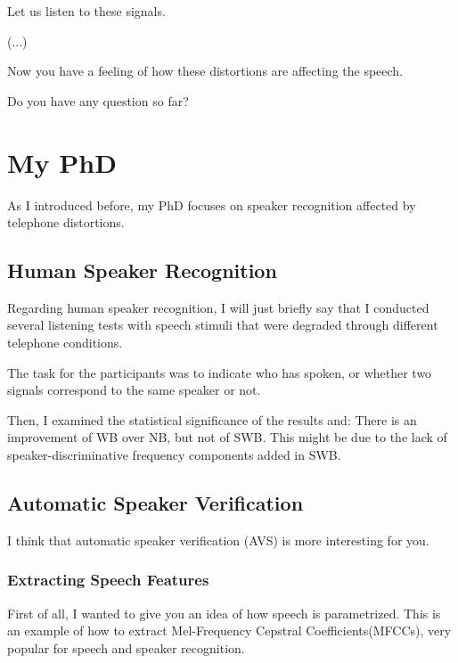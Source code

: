 \documentclass[a4paper]{article}
\begin{document}
Let us listen to these signals.

(...)

Now you have a feeling of how these distortions are affecting the speech.

Do you have any question so far?



\section{My PhD}

As I introduced before, my PhD focuses on speaker recognition affected by telephone distortions.

\subsection{Human Speaker Recognition}

Regarding human speaker recognition, I will just briefly say that I conducted several listening tests with speech stimuli that were degraded through different telephone conditions. 

The task for the participants was to indicate who has spoken, or whether two signals correspond to the same speaker or not.

Then, I examined the statistical significance of the results and: There is an improvement of WB over NB, but not of SWB. This might be due to the lack of speaker-discriminative frequency components added in SWB.


\subsection{Automatic Speaker Verification}

I think that automatic speaker verification (AVS) is more interesting for you.

\subsubsection{Extracting Speech Features}

First of all, I wanted to give you an idea of how speech is parametrized. This is an example of how to extract Mel-Frequency Cepstral Coefficients(MFCCs), very popular for speech and speaker recognition.
\end{document}
